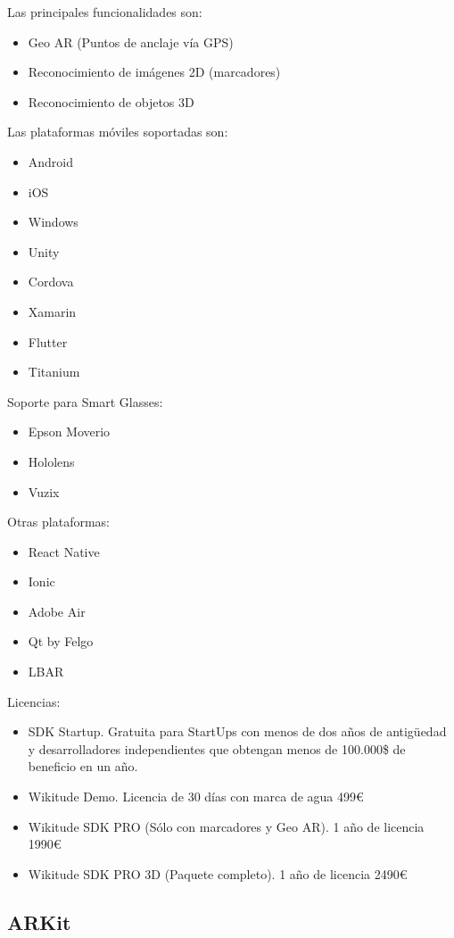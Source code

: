 Las principales funcionalidades son:
\begin{itemize}
\item Geo AR (Puntos de anclaje vía GPS)
\item Reconocimiento de imágenes 2D (marcadores) 
\item Reconocimiento de objetos 3D
\end{itemize}

Las plataformas móviles soportadas son:
\begin{itemize}
\item Android
\item iOS
\item Windows
\item Unity
\item Cordova
\item Xamarin
\item Flutter
\item Titanium
\end{itemize}
Soporte para Smart Glasses:
\begin{itemize}
\item Epson Moverio
\item Hololens
\item Vuzix
\end{itemize}
Otras plataformas:
\begin{itemize}
\item React Native
\item Ionic
\item Adobe Air
\item Qt by Felgo
\item LBAR
\end{itemize}
Licencias:
\begin{itemize}
\item SDK Startup. Gratuita para StartUps con menos de dos años de antigüedad y desarrolladores independientes que obtengan menos de 100.000\$ de beneficio en un año.
\item Wikitude Demo. Licencia de 30 días con marca de agua 499€
\item Wikitude SDK PRO (Sólo con marcadores y Geo AR). 1 año de licencia 1990€
\item Wikitude SDK PRO 3D (Paquete completo). 1 año de licencia 2490€
\end{itemize}

\subsection{ARKit}\label{ARKit_Sec}


